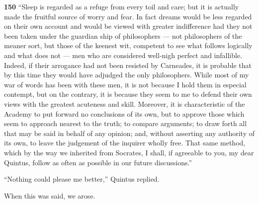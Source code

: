 \textbf{150} ``Sleep is regarded as a refuge from every toil and care; but it is actually made the fruitful source of worry and fear. In fact dreams would be less regarded on their own account and would be viewed with greater indifference had they not been taken under the guardian ­ship of philosophers \texthebrew{—} not philosophers of the meaner sort, but those of the keenest wit, competent to see what follows logically and what does not \texthebrew{—} men who are considered well-nigh perfect and infallible. Indeed, if their arrogance had not been resisted by Carneades, it is probable that by this time they would have adjudged the only philosophers. While most of my war of words has been with these men, it is not because I hold them in especial contempt, but on the contrary, it is because they seem to me to defend their own views with the greatest acuteness and skill. Moreover, it is characteristic of the Academy to put forward no conclusions of its own, but to approve those which seem to approach nearest to the truth; to compare arguments; to draw forth all that may be said in behalf of any opinion; and, without asserting any authority of its own, to leave the judgement of the inquirer wholly free. That same method, which by the way we inherited from Socrates, I shall, if agreeable to you, my dear Quintus, follow as often as possible in our future discussions.''

``Nothing could please me better,'' Quintus replied.

When this was said, we arose.
